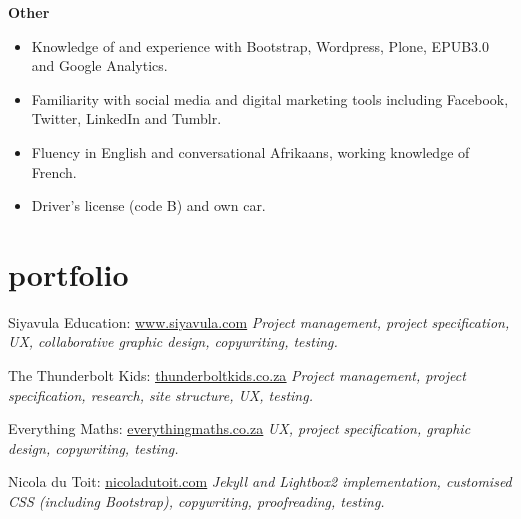 \documentclass[]{friggeri-cv} %
\begin{document}
\textbf{Other}
\begin{itemize}
\item Knowledge of and experience with Bootstrap, Wordpress, Plone, EPUB3.0 and Google Analytics.
 \item Familiarity with social media and digital marketing tools including Facebook, Twitter, LinkedIn and Tumblr.
 \item Fluency in English and conversational Afrikaans, working knowledge of French.
 \item Driver's license (code B) and own car.
\end{itemize}

\pagebreak

\section{portfolio}
\begin{sitelist}

\site
{}
{Siyavula Education: \href{http://www.siyavula.com}{\underline{www.siyavula.com}}}
{}
{\emph{Project management, project specification, UX, collaborative graphic design, copywriting, testing.}}


\site
{}
{The Thunderbolt Kids: \href{http://thunderboltkids.co.za}{\underline{thunderboltkids.co.za}}}
{}
{\emph{Project management, project specification, research, site structure, UX, testing.}}

\site
{}
{Everything Maths: \href{http://www.everythingmaths.co.za}{\underline{everythingmaths.co.za}}}
{}
{\emph{UX, project specification, graphic design, copywriting, testing.}}



\site
{}
{Nicola du Toit: \href{http://www.nicoladutoit.com/ux-portfolio}{\underline{nicoladutoit.com}}}
{}
{\emph{Jekyll and Lightbox2 implementation, customised CSS (including Bootstrap), copywriting, proofreading, testing.}}
\end{sitelist}

\end{document}
